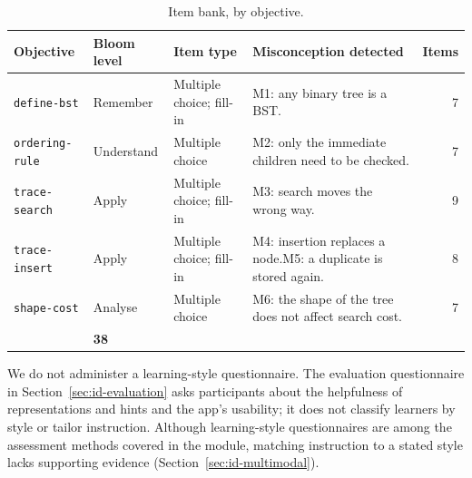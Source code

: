 \begin{table}[htbp]
\centering
\small
\caption{Item bank, by objective.}
\label{tab:itembank}
\renewcommand{\arraystretch}{1.15}
\begin{tabularx}{\textwidth}{@{}>{\raggedright\arraybackslash}p{2.6cm} >{\raggedright\arraybackslash}p{1.9cm} >{\raggedright\arraybackslash}p{2.5cm} >{\raggedright\arraybackslash}X r@{}}
\toprule
Objective & Bloom level & Item type & Misconception detected & Items \\
\midrule
\texttt{define-bst} & Remember & Multiple choice; fill-in & M1: any binary tree is a BST. & 7 \\
\texttt{ordering-rule} & Understand & Multiple choice & M2: only the immediate children need to be checked. & 7 \\
\texttt{trace-search} & Apply & Multiple choice; fill-in & M3: search moves the wrong way. & 9 \\
\texttt{trace-insert} & Apply & Multiple choice; fill-in & M4: insertion replaces a node.\newline M5: a duplicate is stored again. & 8 \\
\texttt{shape-cost} & Analyse & Multiple choice & M6: the shape of the tree does not affect search cost. & 7 \\
\midrule
\multicolumn{4}{@{}r}{\textbf{Total}} & \textbf{38} \\
\bottomrule
\end{tabularx}
\end{table}

We do not administer a learning-style questionnaire. The evaluation questionnaire in Section~\ref{sec:id-evaluation} asks participants about the helpfulness of representations and hints and the app's usability; it does not classify learners by style or tailor instruction. Although learning-style questionnaires are among the assessment methods covered in the module, matching instruction to a stated style lacks supporting evidence (Section~\ref{sec:id-multimodal}).